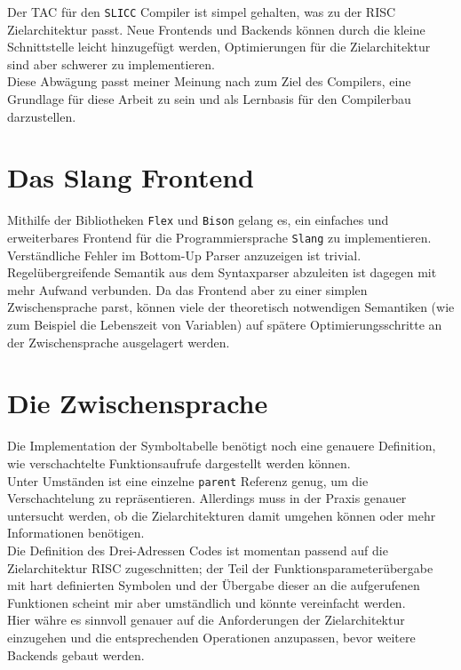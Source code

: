 Der \ac{TAC} für den \texttt{SLICC} Compiler ist simpel gehalten, was zu der \ac{RISC} Zielarchitektur passt.
Neue Frontends und Backends können durch die kleine Schnittstelle leicht hinzugefügt werden, Optimierungen für die Zielarchitektur sind aber schwerer zu implementieren.\\
Diese Abwägung passt meiner Meinung nach zum Ziel des Compilers, eine Grundlage für diese Arbeit zu sein und als Lernbasis für den Compilerbau darzustellen.\\

\section{Das Slang Frontend}

Mithilfe der Bibliotheken \texttt{Flex} und \texttt{Bison} gelang es, ein einfaches und erweiterbares Frontend für die Programmiersprache \texttt{Slang} zu implementieren.\\
Verständliche Fehler im Bottom-Up Parser anzuzeigen ist trivial.
Regelübergreifende Semantik aus dem Syntaxparser abzuleiten ist dagegen mit mehr Aufwand verbunden.
Da das Frontend aber zu einer simplen Zwischensprache parst, können viele der theoretisch notwendigen Semantiken (wie zum Beispiel die Lebenszeit von Variablen) auf spätere Optimierungsschritte an der Zwischensprache ausgelagert werden.\\

\section{Die Zwischensprache}

Die Implementation der Symboltabelle benötigt noch eine genauere Definition, wie verschachtelte Funktionsaufrufe dargestellt werden können.\\
Unter Umständen ist eine einzelne \texttt{parent} Referenz genug, um die Verschachtelung zu repräsentieren.
Allerdings muss in der Praxis genauer untersucht werden, ob die Zielarchitekturen damit umgehen können oder mehr Informationen benötigen.\\

Die Definition des Drei-Adressen Codes ist momentan passend auf die Zielarchitektur \ac{RISC} zugeschnitten;
der Teil der Funktionsparameterübergabe mit hart definierten Symbolen und der Übergabe dieser an die aufgerufenen Funktionen scheint mir aber umständlich und könnte vereinfacht werden.\\
Hier währe es sinnvoll genauer auf die Anforderungen der Zielarchitektur einzugehen und die entsprechenden Operationen anzupassen, bevor weitere Backends gebaut werden.

